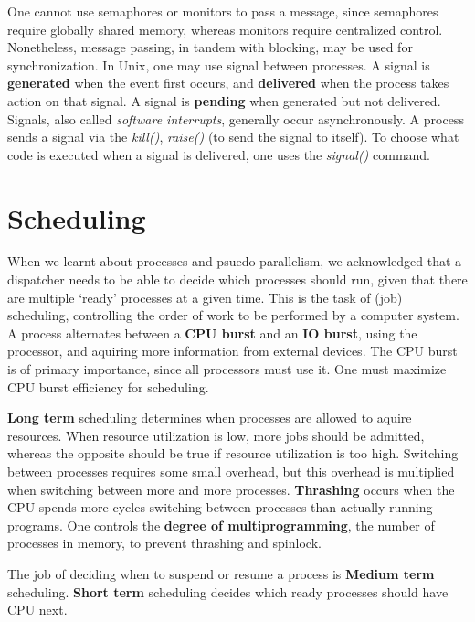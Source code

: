 One cannot use semaphores or monitors to pass a message, since semaphores require globally shared memory, whereas monitors require centralized control. Nonetheless, message passing, in tandem with blocking, may be used for synchronization. In Unix, one may use signal between processes. A signal is {\bf generated} when the event first occurs, and {\bf delivered} when the process takes action on that signal. A signal is {\bf pending} when generated but not delivered. Signals, also called {\it software interrupts}, generally occur asynchronously. A process sends a signal via the {\it kill()}, {\it raise()} (to send the signal to itself). To choose what code is executed when a signal is delivered, one uses the {\it signal()} command.





\chapter{Scheduling}

When we learnt about processes and psuedo-parallelism, we acknowledged that a dispatcher needs to be able to decide which processes should run, given that there are multiple `ready' processes at a given time. This is the task of (job) scheduling, controlling the order of work to be performed by a computer system. A process alternates between a {\bf CPU burst} and an {\bf IO burst}, using the processor, and aquiring more information from external devices. The CPU burst is of primary importance, since all processors must use it. One must maximize CPU burst efficiency for scheduling.

{\bf Long term} scheduling determines when processes are allowed to aquire resources. When resource utilization is low, more jobs should be admitted, whereas the opposite should be true if resource utilization is too high. Switching between processes requires some small overhead, but this overhead is multiplied when switching between more and more processes. {\bf Thrashing} occurs when the CPU spends more cycles switching between processes than actually running programs. One controls the {\bf degree of multiprogramming}, the number of processes in memory, to prevent thrashing and spinlock.

The job of deciding when to suspend or resume a process is {\bf Medium term} scheduling. {\bf Short term} scheduling decides  which ready processes should have CPU next.

